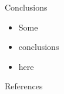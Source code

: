 \documentclass[final]{beamer}
\begin{document}
\begin{frame}
\begin{columns}[T]
\begin{column}{0.49\linewidth}
\begin{block}{Conclusions}
      \vspace{-1ex}
      \begin{itemize}
      \item Some
      \item conclusions
      \item here
      \end{itemize}
      \vspace{-1ex}
    \end{block}
    \begin{block}{References}
      \scriptsize
      \vspace{-2ex}
      \begin{multicols}{2}
        
        
      \end{multicols}
    \end{block}
  \end{column}
  \end{columns}
\end{frame}
\end{document}
